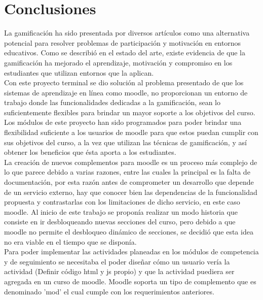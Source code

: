 \chapter{Conclusiones} \label{ch:conclusiones}

\noindent La gamificación ha sido presentada por diversos artículos como una alternativa potencial para resolver problemas de participación
y motivación en entornos educativos. Como se describió  en el estado del arte, existe evidencia de que la gamificación ha mejorado el aprendizaje, motivación
y compromiso en los estudiantes que utilizan entornos que la aplican.\\

\noindent Con este proyecto terminal se dio solución al problema presentado de que los sistemas de aprendizaje en línea como moodle, no proporcionan
un entorno de trabajo donde las funcionalidades dedicadas a la gamificación, sean lo suficientemente flexibles
para brindar un mayor soporte a los objetivos del curso.\\

\noindent Los módulos de este proyecto han sido programados para poder brindar una flexibilidad suficiente 
a los usuarios de moodle para que estos puedan cumplir con sus objetivos del curso, a la vez
que utilizan las técnicas de gamificación, y así obtener los beneficios que ésta aporta a los estudiantes.\\

\noindent La creación de nuevos complementos para moodle es un proceso más complejo de lo que parece debido a
varias razones, entre las cuales la principal es la falta de documentación, por esta razón antes de comprometer 
un desarrollo que depende de un servicio externo, hay que conocer bien las dependencias de la funcionalidad propuesta y contrastarlas
con los limitaciones de dicho servicio, en este caso moodle. Al inicio de este trabajo se proponía 
realizar un modo historia que consiste en ir desbloqueando nuevas secciones del curso, pero debido 
a que moodle no permite el desbloqueo dinámico de secciones, se decidió que esta idea
no era viable en el tiempo que se disponía.\\


\noindent Para poder implementar las actividades planeadas en los módulos de competencia y de seguimiento se necesitaba el poder diseñar
cómo un usuario vería la actividad (Definir código html y js propio) y que la actividad puediera ser agregada en un curso de moodle. Moodle soporta 
un tipo de complemento que es denominado 'mod' el cual cumple con los requerimientos anteriores.\\

